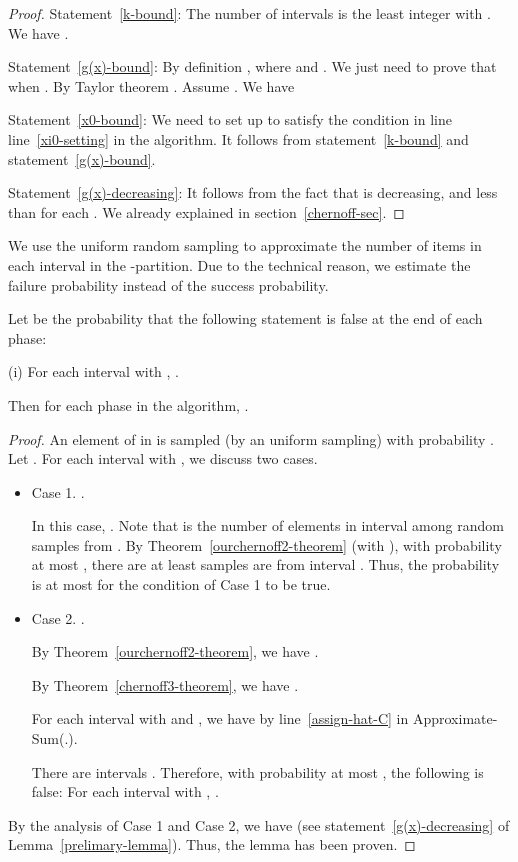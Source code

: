 \documentclass[runningheads]{llncs}
\begin{document}
\begin{proof} Statement~\ref{k-bound}:
The number of intervals  is the least integer with
. We have .

Statement~\ref{g(x)-bound}: By definition
, where  and
. We just need to prove that
 when . By Taylor
theorem . Assume .
We have


Statement~\ref{x0-bound}: We need to set up  to satisfy the
condition in line line~\ref{xi0-setting} in the algorithm. It
follows from statement~\ref{k-bound} and statement~\ref{g(x)-bound}.

Statement~\ref{g(x)-decreasing}: It follows from the fact that
 is decreasing, and less than  for each . We already
 explained in section~\ref{chernoff-sec}.
\end{proof}





We use the uniform random sampling to approximate the  number of
items in each interval  in the -partition. Due
to the technical reason, we estimate the failure probability instead
of the success probability.


\begin{lemma}\label{lemma.1}
Let  be the probability that the following statement is false
at the end of each phase:

(i) For each interval  with , .

Then for each phase in the algorithm, .
\end{lemma}


\begin{proof}
 An element of  in  is sampled (by an uniform sampling)
with probability . Let .
 For each interval  with , we discuss two
cases.

\begin{itemize}
\item
Case 1. .

In this case, . Note that  is
the number of elements in interval  among  random samples
 from . By
Theorem~\ref{ourchernoff2-theorem} (with ), with
probability at most , there are at least  samples
are from interval . Thus, the probability is at most  for
the condition of Case 1 to be true.

\item
Case 2. .

 By
Theorem~\ref{ourchernoff2-theorem}, we have .



By Theorem~\ref{chernoff3-theorem}, we have .


For each interval  with  and , we have  by line~\ref{assign-hat-C} in
Approximate-Sum(.).

There are  intervals . Therefore, with
probability at most ,
 the following is false: For each interval 
with , .
\end{itemize}

 By the
analysis of Case 1 and Case 2, we have   (see
statement~\ref{g(x)-decreasing} of Lemma~\ref{prelimary-lemma}).
Thus, the lemma has been proven.
\end{proof}
\end{document}
